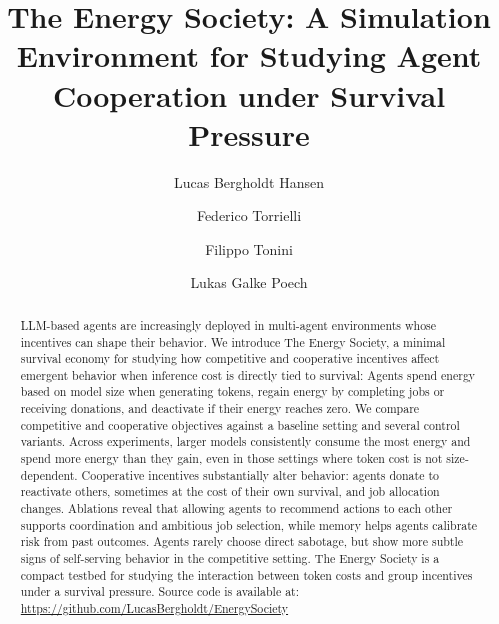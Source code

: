 \documentclass[sigconf,nonacm]{acmart}
\begin{document}
\title{The Energy Society: A Simulation Environment for Studying Agent Cooperation under Survival Pressure}

\author{Lucas Bergholdt Hansen}

\author{Federico Torrielli}

\author{Filippo Tonini}

\author{Lukas Galke Poech}

\begin{abstract}
LLM-based agents are increasingly deployed in multi-agent environments whose incentives can shape their behavior. We introduce The Energy Society, a minimal survival economy for studying how competitive and cooperative incentives affect emergent behavior when inference cost is directly tied to survival: Agents spend energy based on model size when generating tokens, regain energy by completing jobs or receiving donations, and deactivate if their energy reaches zero.
We compare competitive and cooperative objectives against a baseline setting and several control variants.
Across experiments, larger models consistently consume the most energy and spend more energy than they gain, even in those settings where token cost is not size-dependent.
Cooperative incentives substantially alter behavior: agents donate to reactivate others, sometimes at the cost of their own survival, and job allocation changes. 
Ablations reveal that allowing agents to recommend actions to each other supports coordination and ambitious job selection, while memory helps agents calibrate risk from past outcomes.
Agents rarely choose direct sabotage, but show more subtle signs of self-serving behavior in the competitive setting.
The Energy Society is a compact testbed for studying the interaction between  token costs and group incentives under a survival pressure. Source code is available at: \url{https://github.com/LucasBergholdt/EnergySociety}
\end{abstract}
\end{document}

